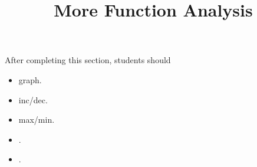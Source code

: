 \documentclass{ximera}
\title{More Function Analysis}
\begin{document}
\begin{abstract}
\end{abstract}
\maketitle

\begin{sectionOutcomes}
After completing this section, students should 

\begin{itemize}
\item graph.
\item inc/dec.
\item max/min.
\item .
\item .
\end{itemize}
\end{sectionOutcomes}
\end{document}
